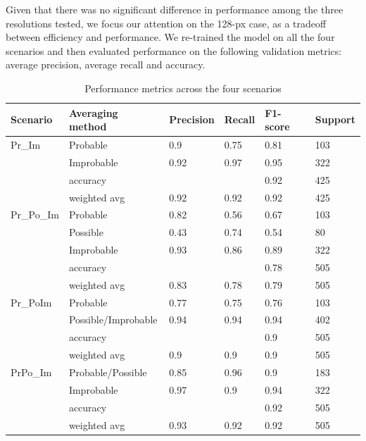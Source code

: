 \documentclass[Journal,letterpaper, SingleSpace, InsideFigs]{ascelike-new}
\begin{document}
Given that there was no significant difference in performance among the three resolutions tested, we focus our attention on the 128-px case, as a tradeoff between efficiency and performance. We re-trained the model on all the four scenarios and then evaluated performance on the following validation metrics: average precision, average recall and accuracy.


\begin{table}[ht]\small
    \centering
\begin{tabular}{@{}llllll@{}}
\toprule
\textbf{Scenario} & \textbf{Averaging method} & \textbf{Precision} & \textbf{Recall} & \textbf{F1-score} & \textbf{Support} \\ \midrule
Pr\_Im    & Probable            & 0.9  & 0.75 & 0.81 & 103 \\
         & Improbable          & 0.92 & 0.97 & 0.95 & 322 \\
         & accuracy            &      &      & 0.92 & 425 \\
         & weighted avg        & 0.92 & 0.92 & 0.92 & 425 \\ \midrule
Pr\_Po\_Im & Probable            & 0.82 & 0.56 & 0.67 & 103 \\
         & Possible            & 0.43 & 0.74 & 0.54 & 80  \\
         & Improbable          & 0.93 & 0.86 & 0.89 & 322 \\
         & accuracy            &      &      & 0.78 & 505 \\
         & weighted avg        & 0.83 & 0.78 & 0.79 & 505 \\ \midrule
Pr\_PoIm  & Probable            & 0.77 & 0.75 & 0.76 & 103 \\
         & Possible/Improbable & 0.94 & 0.94 & 0.94 & 402 \\
         & accuracy            &      &      & 0.9  & 505 \\
         & weighted avg        & 0.9  & 0.9  & 0.9  & 505 \\ \midrule
PrPo\_Im  & Probable/Possible   & 0.85 & 0.96 & 0.9  & 183 \\
         & Improbable          & 0.97 & 0.9  & 0.94 & 322 \\
         & accuracy            &      &      & 0.92 & 505 \\
         & weighted avg        & 0.93 & 0.92 & 0.92 & 505 \\ \bottomrule
\end{tabular}
    \caption{Performance metrics across the four scenarios}
    \label{tab:performance}
\end{table}
\end{document}
